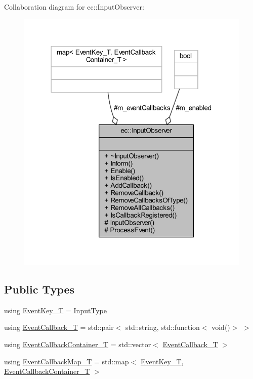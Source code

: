 Collaboration diagram for ec\+:\+:Input\+Observer\+:
\nopagebreak
\begin{figure}[H]
\begin{center}
\leavevmode
\includegraphics[width=318pt]{classec_1_1_input_observer__coll__graph}
\end{center}
\end{figure}
\subsection*{Public Types}
\begin{DoxyCompactItemize}
\item 
using \mbox{\hyperlink{classec_1_1_input_observer_a17892355c418b93d6f20aafff3767ea2}{Event\+Key\+\_\+T}} = \mbox{\hyperlink{namespaceec_a5de6bdb8c4b2ed6e590e721ec998f964}{Input\+Type}}
\item 
using \mbox{\hyperlink{classec_1_1_input_observer_a4de594e1e65fb4f84e7ad3a70d593d21}{Event\+Callback\+\_\+T}} = std\+::pair$<$ std\+::string, std\+::function$<$ void()$>$ $>$
\item 
using \mbox{\hyperlink{classec_1_1_input_observer_a4c09afb629f4cfa2cf769957431ebea0}{Event\+Callback\+Container\+\_\+T}} = std\+::vector$<$ \mbox{\hyperlink{classec_1_1_input_observer_a4de594e1e65fb4f84e7ad3a70d593d21}{Event\+Callback\+\_\+T}} $>$
\item 
using \mbox{\hyperlink{classec_1_1_input_observer_a1edd527067831ae67c3c929c32d62071}{Event\+Callback\+Map\+\_\+T}} = std\+::map$<$ \mbox{\hyperlink{namespaceec_a5de6bdb8c4b2ed6e590e721ec998f964}{Event\+Key\+\_\+T}}, \mbox{\hyperlink{classec_1_1_input_observer_a4c09afb629f4cfa2cf769957431ebea0}{Event\+Callback\+Container\+\_\+T}} $>$
\end{DoxyCompactItemize}
